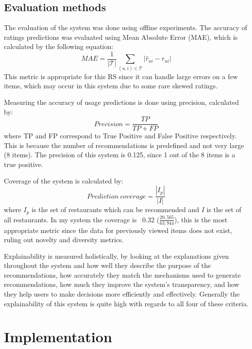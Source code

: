 \documentclass[conference]{IEEEtran}
\begin{document}
\subsection{Evaluation methods}
The evaluation of the system was done using offline experiments. 
The accuracy of ratings predictions was evaluated using Mean Absolute Error (MAE), which is calculated by the 
following equation:
\begin{equation}
    MAE = \frac{1}{|\mathcal{T}|} \sum_{(u,i)\in{\mathcal{T}}} {|\widehat{r}_{ui} - r_{ui}|}
\end{equation}
This metric is appropriate for this RS since it can handle large errors on a few items, which may occur in this system 
due to some rare skewed ratings. 

Measuring the accuracy of usage predictions is done using precision, calculated by: 
\begin{equation}
    Precision = \frac{TP}{TP+FP}
\end{equation}
where TP and FP correspond to True Positive and False Positive respectively. 
This is because the number of recommendations is predefined and not very large (8 items). 
The precision of this system is 0.125, since 1 out of the 8 items is a true positive. 

Coverage of the system is calculated by:
\begin{equation}
    Prediction\ coverage = \frac{|I_p|}{|I|}
\end{equation} 
where $I_p$ is the set of restaurants which can be recommended and $I$ is the set of all restaurants. 
In my system the coverage is ~0.32 ($\frac{20,565}{63,944}$), this is the most appropriate metric since 
the data for previously viewed items does not exist, ruling out novelty and diversity metrics. 

Explainability is measured holistically, by looking at the explanations given throughout the system and how 
well they describe the purpose of the recommendations, how accurately they match the mechanisms used to 
generate recommendations, how much they improve the system's transparency, and how they help users to make decisions 
more efficiently and effectively. 
Generally the explainability of this system is quite high with regards to all four of these criteria. 

\section{Implementation}
\end{document}
